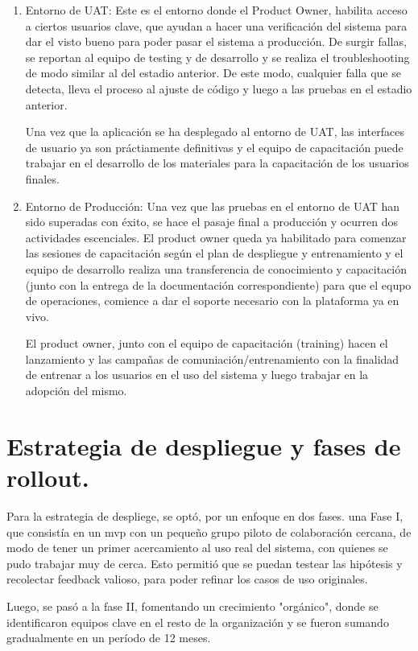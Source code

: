 \begin{enumerate}
    \item Entorno de UAT: Este es el entorno donde el Product Owner, habilita acceso a ciertos usuarios clave, que ayudan a hacer una verificación del sistema para dar el visto bueno para poder pasar el sistema a producción. De surgir fallas, se reportan al equipo de testing y de desarrollo y se realiza el troubleshooting de modo similar al del estadio anterior. De este modo, cualquier falla que se detecta, lleva el proceso al ajuste de código y luego a las pruebas en el estadio anterior.
    
        Una vez que la aplicación se ha desplegado al entorno de UAT, las interfaces de usuario ya son práctiamente definitivas y el equipo de capacitación puede trabajar en el desarrollo de los materiales para la capacitación de los usuarios finales.
    
    \item Entorno de Producción: Una vez que las pruebas en el entorno de UAT han sido superadas con éxito, se hace el pasaje final a producción y ocurren dos actividades escenciales. El product owner queda ya habilitado para comenzar las sesiones de capacitación según el plan de despliegue y entrenamiento y el equipo de desarrollo realiza una transferencia de conocimiento y capacitación (junto con la entrega de la documentación correspondiente) para que el equpo de operaciones, comience a dar el soporte necesario con la plataforma ya en vivo. 
    
    El product owner, junto con el equipo de capacitación (training) hacen el lanzamiento y las campañas de comuniación/entrenamiento con la finalidad de entrenar a los usuarios en el uso del sistema y luego trabajar en la adopción del mismo.
\end{enumerate}

\section{Estrategia de despliegue y fases de rollout.}

Para la estrategia de despliege, se optó, por un enfoque en dos fases. una Fase I, que consistía en un \gls{mvp} con un pequeño grupo piloto de colaboración cercana, de modo de tener un primer acercamiento al uso real del sistema, con quienes se pudo trabajar muy de cerca. Esto permitió que se puedan testear las hipótesis y recolectar feedback valioso, para poder refinar los casos de uso originales.

Luego, se pasó a la fase II, fomentando un crecimiento "orgánico", donde se identificaron equipos clave en el resto de la organización y se fueron sumando gradualmente en un período de 12 meses.

